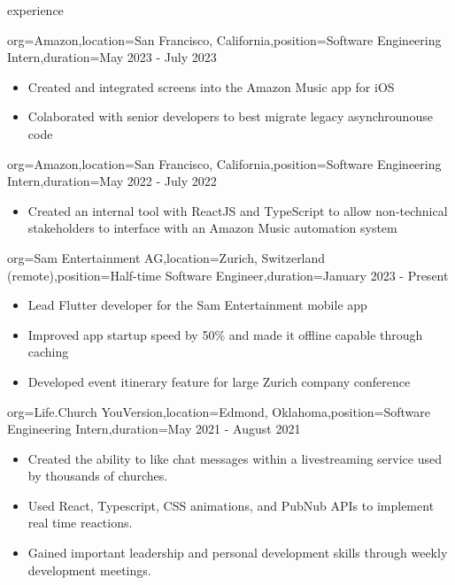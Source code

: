 \documentclass{resume}
\begin{document}
\begin{ResumeSection}{experience}
    \begin{ResumeSubsection}{org={Amazon},location={San Francisco,
        California},position={Software Engineering Intern},duration={May 2023 -
    July 2023}}
        \begin{itemize}
            \item Created and integrated screens into the Amazon Music app for iOS
            \item Colaborated with senior developers to best migrate legacy
                asynchrounouse code
        \end{itemize}
    \end{ResumeSubsection}
    \begin{ResumeSubsection}{org={Amazon},location={San Francisco, California},position={Software Engineering Intern},duration={May 2022 - July 2022}}
        \begin{itemize}
            \item Created an internal tool with ReactJS and TypeScript to allow
                non-technical stakeholders to interface with an Amazon Music automation
                system
        \end{itemize}
    \end{ResumeSubsection}

    \begin{ResumeSubsection}{org={Sam Entertainment AG},location={Zurich,
        Switzerland (remote)},position={Half-time Software Engineer},duration={January
    2023 - Present}}
        \begin{itemize}
            \item Lead Flutter developer for the Sam Entertainment mobile app
            \item Improved app startup speed by 50\% and made it offline capable
                through caching
            \item Developed event itinerary feature for large Zurich company
                conference
        \end{itemize}
    \end{ResumeSubsection}

    \begin{ResumeSubsection}{org={Life.Church YouVersion},location={Edmond, Oklahoma},position={Software Engineering Intern},duration={May 2021 - August 2021}}
        \begin{itemize}
            \item {Created the ability to like chat messages within a livestreaming service used by
                thousands of churches.}
            \item {Used React, Typescript, CSS animations, and
                PubNub APIs to implement real time reactions.}
            \item Gained important leadership and personal development skills
                through weekly development meetings.
        \end{itemize}
    \end{ResumeSubsection}


\end{ResumeSection}
\end{document}
